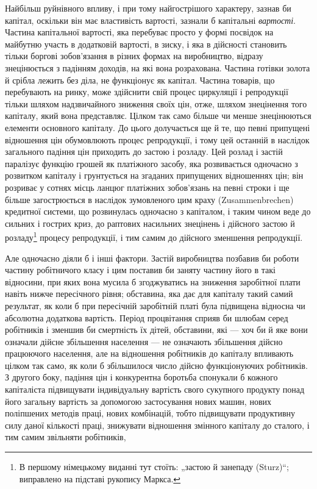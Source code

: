 
Найбільш руйнівного впливу, і при тому найгострішого
характеру, зазнав би капітал, оскільки він має властивість
вартості, зазнали б капітальні \emph{вартості}. Частина капітальної
вартості, яка перебуває просто у формі посвідок на майбутню
участь в додатковій вартості, в зиску, і яка в дійсності становить
тільки боргові зобов’язання в різних формах на виробництво,
відразу знецінюється з падінням доходів, на які вона розрахована.
Частина готівки золота й срібла лежить без діла, не функціонує
як капітал. Частина товарів, що перебувають на ринку, може
здійснити свій процес циркуляції і репродукції тільки шляхом
надзвичайного зниження своїх цін, отже, шляхом знецінення
того капіталу, який вона представляє. Цілком так само більше
чи менше знецінюються елементи основного капіталу. До цього
долучається ще й те, що певні припущені відношення цін
обумовлюють процес репродукції, і тому цей останній в наслідок
загального падіння цін приходить до застою і розладу. Цей
розлад і застій паралізує функцію грошей як платіжного засобу,
яка розвивається одночасно з розвитком капіталу і грунтується
на згаданих припущених відношеннях цін; він розриває у сотнях
місць ланцюг платіжних зобов’язань на певні строки і ще більше
загострюється в наслідок зумовленого цим краху (Zusammenbrechen)
кредитної системи, що розвинулась одночасно з капіталом,
і таким чином веде до сильних і гострих криз, до раптових
насильних знецінень і дійсного застою й розладу\footnote*{
В першому німецькому виданні тут стоїть: „застою й занепаду (Sturz)“;
виправлено на підставі рукопису Маркса. 
} процесу
репродукції, і тим самим до дійсного зменшення репродукції.

Але одночасно діяли б і інші фактори. Застій виробництва
позбавив би роботи частину робітничого класу і цим поставив би
заняту частину його в такі відносини, при яких вона мусила б
згоджуватись на зниження заробітної плати навіть нижче пересічного
рівня; обставина, яка дає для капіталу такий самий результат,
як коли б при пересічній заробітній платі була підвищена
відносна чи абсолютна додаткова вартість. Період процвітання
сприяв би шлюбам серед робітників і зменшив би смертність їх
дітей, обставини, які — хоч би й яке вони означали дійсне збільшення
населення — не означають збільшення дійсно працюючого
населення, але на відношення робітників до капіталу впливають
цілком так само, як коли б збільшилося число дійсно функціонуючих
робітників. З другого боку, падіння цін і конкурентна
боротьба спонукали б кожного капіталіста підвищувати індивідуальну
вартість свого сукупного продукту понад його загальну
вартість за допомогою застосування нових машин, нових поліпшених
методів праці, нових комбінацій, тобто підвищувати продуктивну
силу даної кількості праці, знижувати відношення
змінного капіталу до сталого, і тим самим звільняти робітників,
\parbreak{}  %
